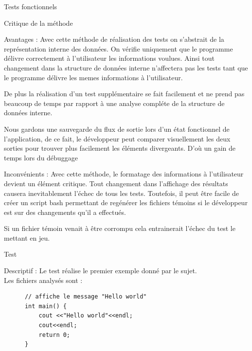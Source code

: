 \documentclass{article}
\begin{document}
\begin{section}{Tests fonctionnels}
 \begin{subsection}{Critique de la méthode}
    \begin{paragraph}{Avantages :}
      Avec cette méthode de réalisation des tests on s'abstrait de la représentation interne des données. On vérifie uniquement
      que le programme délivre correctement à l'utilisateur les informations voulues. Ainsi tout changement dans la structure de
      données interne n'affectera pas les tests tant que le programme délivre les memes informations à l'utilisateur.
      
      De plus la réalisation d'un test supplémentaire se fait facilement et ne prend pas beaucoup de temps par rapport à une analyse
      compléte de la structure de données interne.
      
      Nous gardons une sauvegarde du flux de sortie lors d'un état fonctionnel de l'application, de ce fait, le développeur peut 
      comparer visuellement les deux sorties pour trouver plus facilement les éléments divergeants. D'où un gain de temps lors du débuggage 
    \end{paragraph}

    \begin{paragraph}{Inconvénients :}
      Avec cette méthode, le formatage des informations à l'utilisateur devient un élément critique. Tout changement dans l'affichage des résultats causera
      inevitablement l'échec de tous les tests. Toutefois, il peut être facile de créer un script bash permettant de regénérer les fichiers témoins
      si le développeur est sur des changements qu'il a effectués.
      
      Si un fichier témoin venait à être corrompu cela entrainerait l'échec du test le mettant en jeu.
    \end{paragraph}
 \end{subsection}

  \newpage
  
  \begin{subsection}{Test }
    \begin{paragraph}{Descriptif :}
      Le test  réalise le premier exemple donné par le sujet.\\ Les fichiers analysés sont : 
      
      \begin{listing}[h!]
      \begin{verbatim}
	  // affiche le message "Hello world"
	  int main() {
	      cout <<"Hello world"<<endl;
	      cout<<endl;
	      return 0;
	  }
      \end{verbatim}
      \end{listing}
      

\end{paragraph}
\end{subsection}
\end{section}
\end{document}
